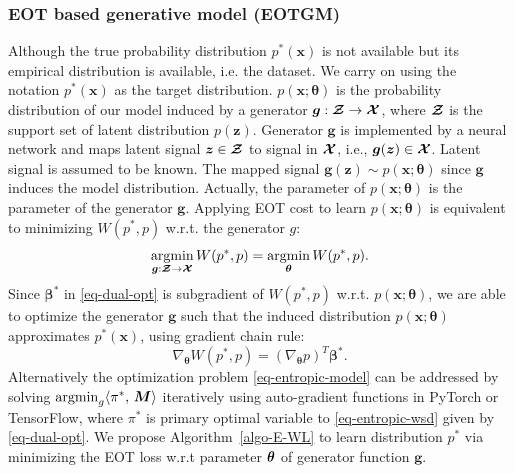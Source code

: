 \subsubsection{EOT based generative model (EOTGM)}\label{subsec-gmeot}
{Although the true probability distribution $p^{\ast}(\bm{x})$ is not available but its empirical distribution is available, i.e. the dataset. We carry on using the notation $p^{\ast}(\bm{x})$ as the target distribution. $p(\bm{x};\bm{\theta})$ is the probability distribution of our model induced by a generator $\bm{g}: \bm{\mathcal{Z}} \rightarrow \bm{\mathcal{X}}$, where $\bm{\mathcal{Z}}$ is the support set of latent distribution $p(\bm{z})$. Generator $\bm{g}$ is implemented by a neural network and maps latent signal $\bm{z} \in \bm{\mathcal{Z}}$ to signal in $\bm{\mathcal{X}}$, i.e., $\bm{g}(\bm{z}) \in \bm{\mathcal{X}}$. Latent signal is assumed to be known. The mapped signal $\bm{g}(\bm{z}) \sim p(\bm{x};\bm{\theta})$ since $\bm{g}$ induces the model distribution. Actually, the parameter of $p(\bm{x};\bm{\theta})$ is the parameter of the generator $\bm{g}$. Applying EOT cost to learn $p(\bm{x}; \bm{\theta})$ is equivalent to minimizing $W(p^{\ast}, p)$ w.r.t. the generator $g$}:
\begin{equation}\label{eq-entropic-model}
  \underset{\bm{g}:\bm{\mathcal{Z}}\to \bm{\mathcal{X}}}{\operatorname{argmin}}\, W(p^{\ast}, p) = \underset{\bm{\theta}}{\operatorname{argmin}}\, W(p^{\ast}, p).
\end{equation}
Since $\bm{\beta}^{\ast}$ in \eqref{eq-dual-opt} is subgradient of $W(p^{\ast}, p)$ w.r.t. $p(\bm{x};\bm{\theta})$, we are able to
optimize the generator $\bm{g}$ such that the induced distribution $p(\bm{x};\bm{\theta})$ approximates $p^{\ast}(\bm{x})$, using gradient chain rule:
\begin{equation}
  \nabla_{\bm{\theta}}W(p^{\ast}, p) = \left(\nabla_{\bm{\theta}}p\right)^{T} \bm{\beta}^{\ast}.
\end{equation}
Alternatively the optimization problem \eqref{eq-entropic-model} can be addressed by solving $\operatorname{argmin}_{g}\langle \pi^{\ast},\,\bm{M}\rangle $ iteratively using auto-gradient functions in PyTorch\cite{pytorch} or
TensorFlow\cite{tensorflow}, where $\pi^{\ast}$ is primary optimal
variable to \eqref{eq-entropic-wsd} given by \eqref{eq-dual-opt}. We
propose Algorithm~\ref{algo-E-WL} to learn distribution $p^{\ast}$
via minimizing the EOT loss w.r.t parameter $\bm{\theta}$ of generator function $\bm{g}$.
